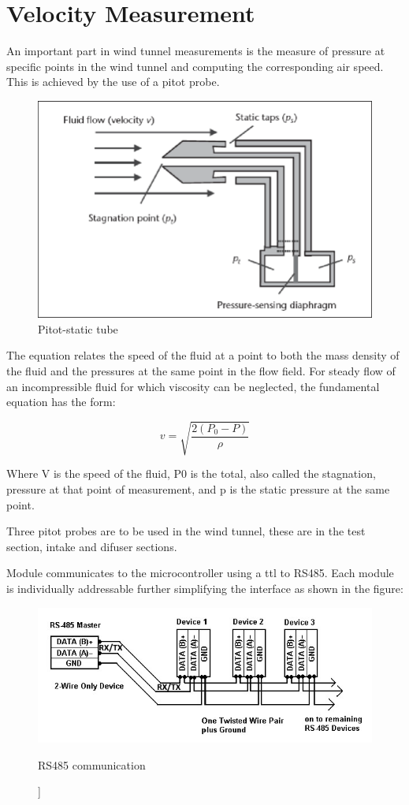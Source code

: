 \section{Velocity Measurement}
An important part in wind tunnel measurements is the measure of pressure at specific points in the wind tunnel and computing the corresponding air speed. This is achieved by the use of a pitot probe. 
\begin{center}
\begin{figure}
\centering
\includegraphics[width=0.6\linewidth]{Figures/pitot}
\caption[Pitot-static tube]{Pitot-static tube \cite{noauthor_wind_nodate}}
\end{figure}
\end{center}
The equation relates the speed of the fluid at a point to both the mass density of the fluid and the pressures at the same point in the flow field. For steady flow of an incompressible fluid for which viscosity can be neglected, the fundamental equation has the form:

$$ v = \sqrt{\frac{2(P_{0} - P)}{\rho}}$$

Where V is the speed of the fluid, P0 is the total, also called the stagnation, pressure at that point of measurement, and p is the static pressure at the same point.

Three pitot probes are to be used in the wind tunnel, these are in the test section, intake and difuser sections.

Module communicates to the microcontroller using a ttl to RS485. Each module is individually addressable further simplifying the interface as shown in the figure:
\begin{center}
\begin{figure}
\centering
\includegraphics{Figures/modbus}
\caption[RS485 communication]]{RS485 communication}
\end{figure}
\end{center}

